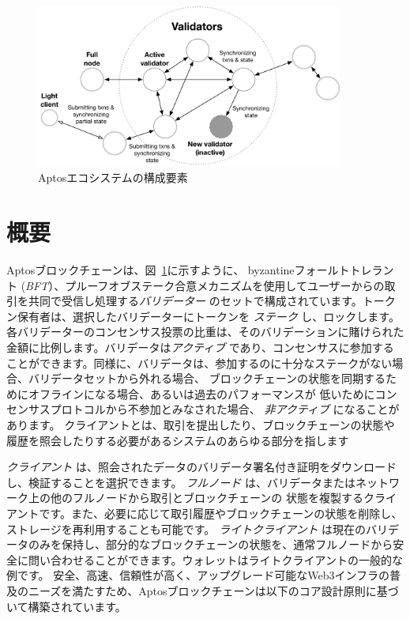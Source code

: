 \documentclass{article}
\begin{document}
\begin{figure}
\centering
\includegraphics[width=0.9\textwidth]{validators.pdf}
\caption{\label{fig:aptos_ecosystem}Aptosエコシステムの構成要素}
\end{figure}

\section{概要}
\label{sec:overview}

Aptosブロックチェーンは、図~\ref{fig:aptos_ecosystem}に示すように、 byzantineフォールトトレラント (\emph{BFT}）、プルーフオブステーク合意メカニズムを使用してユーザーからの取引を共同で受信し処理する\emph{バリデーター} のセットで構成されています。トークン保有者は、選択したバリデーターにトークンを \emph{ステーク} し、ロックします。各バリデーターのコンセンサス投票の比重は、そのバリデーションに賭けられた金額に比例します。バリデータは\emph{アクティブ} であり、コンセンサスに参加することができます。同様に、バリデータは、参加するのに十分なステークがない場合、バリデータセットから外れる場合、 ブロックチェーンの状態を同期するためにオフラインになる場合、あるいは過去のパフォーマンスが 低いためにコンセンサスプロトコルから不参加とみなされた場合、\emph{ 非アクティブ} になることがあります。 クライアントとは、取引を提出したり、ブロックチェーンの状態や履歴を照会したりする必要があるシステムのあらゆる部分を指します

\emph{クライアント} は、照会されたデータのバリデータ署名付き証明をダウンロードし、検証することを選択できます。
\emph{フルノード} は、バリデータまたはネットワーク上の他のフルノードから取引とブロックチェーンの 状態を複製するクライアントです。また、必要に応じて取引履歴やブロックチェーンの状態を削除し、ストレージを再利用することも可能です。
\emph{ライトクライアント} は現在のバリデータのみを保持し、部分的なブロックチェーンの状態を、通常フルノードから安全に問い合わせることができます。ウォレットはライトクライアントの一般的な例です。 安全、高速、信頼性が高く、アップグレード可能なWeb3インフラの普及のニーズを満たすため、Aptosブロックチェーンは以下のコア設計原則に基づいて構築されています。
\end{document}
